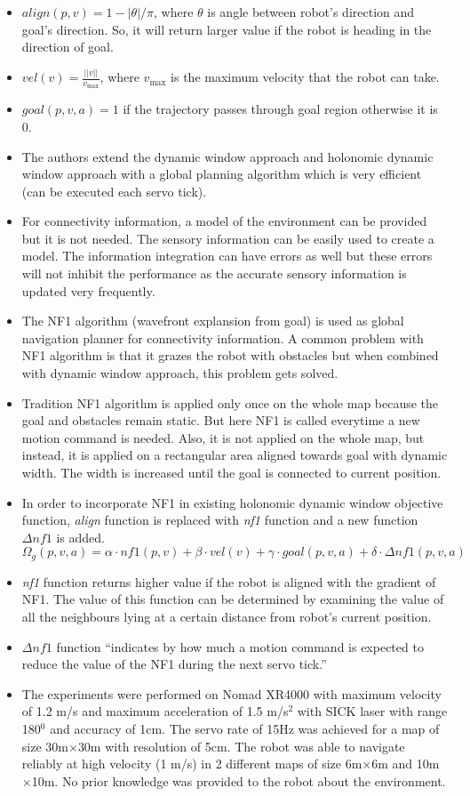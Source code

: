 \documentclass[12pt]{article}
\begin{document}
\begin{itemize}
    \item $align(p,v) = 1 - |\theta|/\pi$, where $\theta$ is angle between robot's direction and goal's direction. So, it will return larger value if the robot is heading in the direction of goal.
    \item $vel(v) = \frac{||v||}{v_{\max}}$, where $v_{\max}$ is the maximum velocity that the robot can take.
    \item $goal(p,v,a) = 1$ if the trajectory passes through goal region otherwise it is 0.
    \item The authors extend the dynamic window approach\cite{fox1997dynamic} and holonomic dynamic window approach with a global planning algorithm which is very efficient (can be executed each servo tick).
    \item For connectivity information, a model of the environment can be provided but it is not needed. The sensory information can be easily used to create a model. The information integration can have errors as well but these errors will not inhibit the performance as the accurate sensory information is updated very frequently. 
    \item The NF1 algorithm (wavefront explansion from goal) is used as global navigation planner for connectivity information. A common problem with NF1 algorithm is that it grazes the robot with obstacles but when combined with dynamic window approach, this problem gets solved.
    \item Tradition NF1 algorithm is applied only once on the whole map because the goal and obstacles remain static. But here NF1 is called everytime a new motion command is needed. Also, it is not applied on the whole map, but instead, it is applied on a rectangular area aligned towards goal with dynamic width. The width is increased until the goal is connected to current position.
    \item In order to incorporate NF1 in existing holonomic dynamic window objective function, \textit{align} function is replaced with \textit{nf1} function and a new function $\Delta nf1$ is added.$$\Omega_g(p, v, a) = \alpha \cdot nf1(p,v) + \beta \cdot vel(v) + \gamma \cdot goal(p,v,a) + \delta \cdot \Delta nf1(p,v,a)$$
    \item \textit{nf1} function returns higher value if the robot is aligned with the gradient of NF1. The value of this function can be determined by examining the value of all the neighbours lying at a certain distance from robot's current position.
    \item $\Delta nf1$ function  ``indicates by how much a
        motion command is expected to reduce the value of
        the NF1 during the next servo tick.''\cite{brook1999high}
    \item The experiments were performed on Nomad XR4000 with maximum velocity of 1.2 m/s and maximum acceleration of 1.5 m/s$^2$ with SICK laser with range 180$^0$ and accuracy of 1cm. The servo rate of 15Hz was achieved for a map of size 30m$\times$30m with resolution of 5cm. The robot was able to navigate reliably at high velocity (1 m/s) in 2 different maps of size 6m$\times$6m and 10m$\times$10m. No prior knowledge was provided to the robot about the environment.
\end{itemize}
\end{document}
